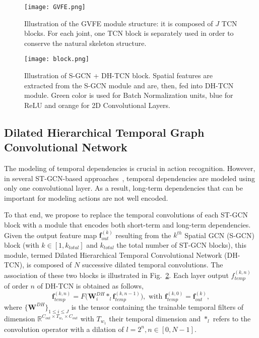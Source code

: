 \documentclass{article}
\begin{document}
\begin{figure}[t]
\centering 
    \texttt{[image: GVFE.png]}
    \caption{Illustration of the GVFE module structure: it is composed of $J$ TCN blocks. For each joint, one TCN block is separately used in order to conserve the natural skeleton structure.  }
    \label{fig:GVFE}
\end{figure}


\begin{figure}[t]
\centering 
    \texttt{[image: block.png]}
    \caption{Illustration of S-GCN + DH-TCN block. Spatial features are extracted from the S-GCN module and are, then, fed into DH-TCN module. Green color is used for Batch Normalization units, blue for ReLU and orange for 2D Convolutional Layers.}
    \label{fig:block}
\end{figure}


\subsection{Dilated Hierarchical Temporal Graph Convolutional Network}
\label{sec:htcn}


The modeling of temporal dependencies is crucial in action recognition. However, in several ST-GCN-based approaches~\cite{yan2018spatial, shi2019two, shi2019skeleton, li2019actional}, temporal dependencies are modeled using only one convolutional layer. As a result, long-term dependencies that can be important for modeling actions are not well encoded. 

To that end, we propose to replace the temporal convolutions of each ST-GCN block with a module that encodes both short-term and long-term dependencies. Given the output feature map $\mathbf f^{(k)}_{out}$ resulting from the $k^{th}$ Spatial GCN (S-GCN) block (with $k \in [1, k_{total}]$ and $k_{total}$ the total number of ST-GCN blocks), this module, termed Dilated Hierarchical Temporal Convolutional Network (DH-TCN), is composed of $N$ successive dilated temporal convolutions. The association of these two blocks is illustrated in Fig.~\ref{fig:block}. Each layer output ${f}_{temp}^{(k,n)}$ of order $n$ of DH-TCN is obtained as follows,
\begin{equation}
    \mathbf{f}_{temp}^{(k,n)} = F \Big(\mathbf{W}_i^{DH} \ast_l  \mathbf f_{temp}^{(k,n-1)}\Big), \text{ with } \mathbf{f}_{temp}^{(k,0)} = \mathbf f^{(k)}_{out},
\end{equation}
\noindent where $\{ \mathbf W^{DH}\}_{1 \leq i \leq J}$ is the tensor containing the trainable temporal filters of dimension $\mathbb R^{C_{out} \times T_{w_1} \times C_{out}}$ with $T_{w_1}$ their temporal dimension and $\ast_l$ refers to the convolution operator with a dilation of $l=2^n, n\in [0,N-1]$.
\end{document}
